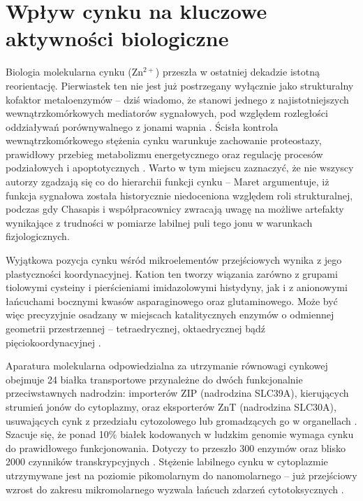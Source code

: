 \documentclass[12pt,a4paper]{article}
\begin{document}

\section{Wpływ cynku na kluczowe aktywności biologiczne}

Biologia molekularna cynku (Zn\(^{2+}\)) przeszła w ostatniej dekadzie istotną reorientację. Pierwiastek ten nie jest już postrzegany wyłącznie jako strukturalny kofaktor metaloenzymów -- dziś wiadomo, że stanowi jednego z najistotniejszych wewnątrzkomórkowych mediatorów sygnałowych, pod względem rozległości oddziaływań porównywalnego z jonami wapnia \cite{chen2024}. Ścisła kontrola wewnątrzkomórkowego stężenia cynku warunkuje zachowanie proteostazy, prawidłowy przebieg metabolizmu energetycznego oraz regulację procesów podziałowych i apoptotycznych \cite{kambe2015}. Warto w tym miejscu zaznaczyć, że nie wszyscy autorzy zgadzają się co do hierarchii funkcji cynku -- Maret \cite{maret2019} argumentuje, iż funkcja sygnałowa została historycznie niedoceniona względem roli strukturalnej, podczas gdy Chasapis i współpracownicy \cite{chasapis2020} zwracają uwagę na możliwe artefakty wynikające z trudności w pomiarze labilnej puli tego jonu w warunkach fizjologicznych.

Wyjątkowa pozycja cynku wśród mikroelementów przejściowych wynika z jego plastyczności koordynacyjnej. Kation ten tworzy wiązania zarówno z grupami tiolowymi cysteiny i pierścieniami imidazolowymi histydyny, jak i z anionowymi łańcuchami bocznymi kwasów asparaginowego oraz glutaminowego. Może być więc precyzyjnie osadzany w miejscach katalitycznych enzymów o odmiennej geometrii przestrzennej -- tetraedrycznej, oktaedrycznej bądź pięciokoordynacyjnej \cite{chasapis2020}.

Aparatura molekularna odpowiedzialna za utrzymanie równowagi cynkowej obejmuje 24 białka transportowe przynależne do dwóch funkcjonalnie przeciwstawnych nadrodzin: importerów ZIP (nadrodzina SLC39A), kierujących strumień jonów do cytoplazmy, oraz eksporterów ZnT (nadrodzina SLC30A), usuwających cynk z przedziału cytozolowego lub gromadzących go w organellach \cite{hara2017, kambe2015}. Szacuje się, że ponad 10\% białek kodowanych w ludzkim genomie wymaga cynku do prawidłowego funkcjonowania. Dotyczy to przeszło 300 enzymów oraz blisko 2000 czynników transkrypcyjnych \cite{chen2024}. Stężenie labilnego cynku w cytoplazmie utrzymywane jest na poziomie pikomolarnym do nanomolarnego -- już przejściowy wzrost do zakresu mikromolarnego wyzwala łańcuch zdarzeń cytotoksycznych \cite{maret2019}.
\end{document}
